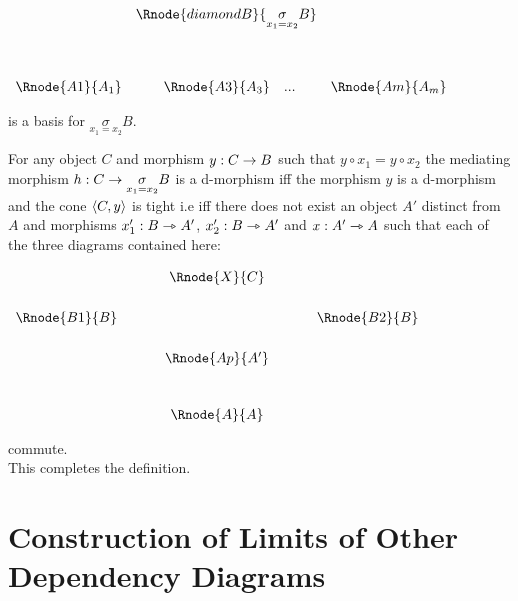 \documentclass[10pt,a4paper]{article}
\begin{document}
\begin{enumerate} [(i)]
\begin{center}
\setlength{\arraycolsep}{.1cm}
$
\begin{array}{cp{.35cm}cp{.4cm}c}
                  & \multicolumn{3}{c}{\Rnode{diamondB}{\underset{x_1=x_2}{\sigma}B}}& \\ [1.4cm]
\Rnode{A1}{A_1} & &\Rnode{A3}{A_3} &... & \Rnode{Am}{A_m}\\
\end{array}
$
\end{center}
\setlength{\arraycolsep}{0.1cm}
\noindent is a basis for $\underset{x_1=x_2}{\sigma}B$. 

\noindent For any object $C$ and morphism $y: C \rightarrow B$ such that
$y \circ x_1 = y \circ x_2$
the mediating morphism $h: C \rightarrow \underset{x_1=x_2}{\sigma}B$ is a d-morphism iff 
the morphism $y$ is a d-morphism and the cone $\left\langle C,y\right\rangle$ is tight i.e iff there does not exist an object $A'$ distinct from 
$A$ and morphisms $x'_1: B \rightarrowtriangle A'$, $x'_2: B \rightarrowtriangle A'$ and $x:A' \rightarrowtriangle A$ such that each of the three diagrams contained here:

\begin{center}
$
\begin{array}{cp{0.5cm}cp{0.5cm}c}
               && \Rnode{X}{C}&&                  \\ [0.6cm]
\Rnode{B1}{B}&&                  && \Rnode{B2}{B} \\ [0.6cm]
               &&\Rnode{Ap}{A'}  &&               \\ [1cm]
               &&\Rnode{A}{A}    && 
\end{array}
$
\end{center}

\noindent commute. \\


\noindent This completes the definition.

\end{enumerate}

\section{Construction of Limits of Other Dependency Diagrams}
\end{document}

